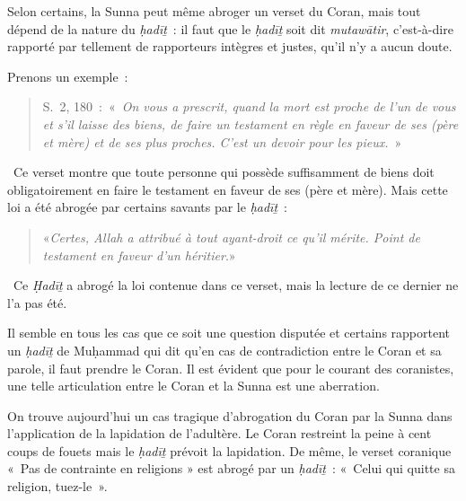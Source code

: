 
Selon certains, la Sunna peut même abroger un verset du Coran, mais tout
dépend de la nature du \emph{ḥadīṯ}~: il faut que le \emph{ḥadīṯ} soit
dit \emph{mutawātir}, c'est-à-dire rapporté par tellement de rapporteurs
intègres et justes, qu'il n'y a aucun doute.

Prenons un exemple~: 
\begin{quote}
  S.~2, 180~:~«~\emph{On vous a prescrit, quand la
mort est proche de l'un de vous et s'il laisse des biens, de faire un
testament en règle en faveur de ses (père et mère) et de ses plus
proches. C'est un devoir pour les pieux.}~»  
\end{quote}


~Ce verset montre que toute personne qui possède suffisamment de biens
doit obligatoirement en faire le testament en faveur de ses (père et
mère). Mais cette loi a été abrogée par certains savants par le
\emph{ḥadīṯ}~: 
\begin{quote}
    «\emph{Certes, Allah a attribué à tout ayant-droit ce
qu'il mérite. Point de testament en faveur d'un héritier}.»
\end{quote}


~Ce \emph{Ḥadīṯ} a abrogé la loi contenue dans ce verset, mais la
lecture de ce dernier ne l'a pas été.

Il semble en tous les cas que ce soit une question disputée et certains
rapportent un \emph{ḥadīṯ} de Muḥammad qui dit qu'en cas de
contradiction entre le Coran et sa parole, il faut prendre le Coran. Il
est évident que pour le courant des coranistes, une telle articulation
entre le Coran et la Sunna est une aberration.

On trouve aujourd'hui un cas tragique d'abrogation du Coran par la Sunna
dans l'application de la lapidation de l'adultère. Le Coran restreint la
peine à cent coups de fouets mais le \emph{ḥadīṯ} prévoit la lapidation.
De même, le verset coranique «~Pas de contrainte en religions » est
abrogé par un \emph{ḥadīṯ}~: «~Celui qui quitte sa religion, tuez-le~».


